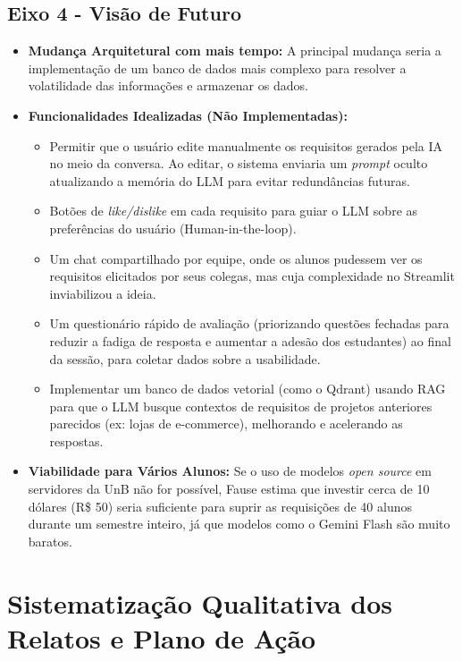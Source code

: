 \begin{apendicesenv}
\section*{Eixo 4 - Visão de Futuro}

\begin{itemize}
  \item \textbf{Mudança Arquitetural com mais tempo:} A principal mudança seria a implementação de um banco de dados mais complexo para resolver a volatilidade das informações e armazenar os dados.
  \item \textbf{Funcionalidades Idealizadas (Não Implementadas):}
  \begin{itemize}
    \item Permitir que o usuário edite manualmente os requisitos gerados pela IA no meio da conversa. Ao editar, o sistema enviaria um \textit{prompt} oculto atualizando a memória do LLM para evitar redundâncias futuras.
    \item Botões de \textit{like/dislike} em cada requisito para guiar o LLM sobre as preferências do usuário (Human-in-the-loop).
    \item Um chat compartilhado por equipe, onde os alunos pudessem ver os requisitos elicitados por seus colegas, mas cuja complexidade no Streamlit inviabilizou a ideia.
    \item Um questionário rápido de avaliação (priorizando questões fechadas para reduzir a fadiga de resposta e aumentar a adesão dos estudantes) ao final da sessão, para coletar dados sobre a usabilidade.
    \item Implementar um banco de dados vetorial (como o Qdrant) usando RAG para que o LLM busque contextos de requisitos de projetos anteriores parecidos (ex: lojas de e-commerce), melhorando e acelerando as respostas.
  \end{itemize}
  \item \textbf{Viabilidade para Vários Alunos:} Se o uso de modelos \textit{open source} em servidores da UnB não for possível, Fause estima que investir cerca de 10 dólares (R\$ 50) seria suficiente para suprir as requisições de 40 alunos durante um semestre inteiro, já que modelos como o Gemini Flash são muito baratos.
\end{itemize}

\chapter{Sistematização Qualitativa dos Relatos e Plano de Ação}
\label{apendice:triagem_qualitativa}


\end{apendicesenv}
